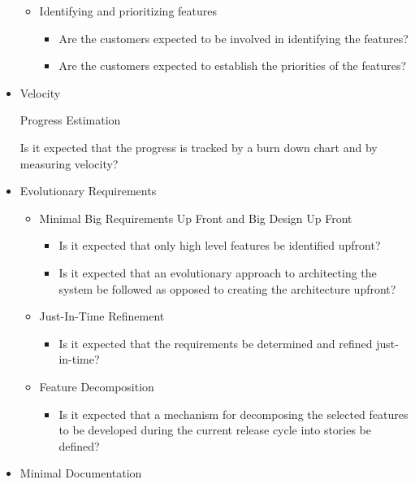 \begin{appendices}
\begin{itemize}
\begin{itemize}
			\item Identifying and prioritizing features
				\begin{itemize}
					\item Are the customers expected to be involved in identifying the features?
					\item Are the customers expected to establish the priorities of the features?
				\end{itemize}
		\end{itemize}
	\item Velocity
		\begin{itemize}
			\addition Progress Estimation
				\begin{itemize}
					\addition Is it expected that the progress is tracked by a burn down chart and by measuring velocity?
				\end{itemize}
		\end{itemize}
	\item Evolutionary Requirements
		\begin{itemize}
			\item Minimal Big Requirements Up Front and Big Design Up Front
				\begin{itemize}
					\item Is it expected that only high level features be identified upfront?
					\item Is it expected that an evolutionary approach to architecting the system be followed as opposed to creating the architecture upfront?
				\end{itemize}
			\item Just-In-Time Refinement
				\begin{itemize}
					\item Is it expected that the requirements be determined and refined just-in-time?
				\end{itemize}
			\item Feature Decomposition
				\begin{itemize}
					\item Is it expected that a mechanism for decomposing the selected features to be developed during the current release cycle into stories be defined?
				\end{itemize}
		\end{itemize}
	\item Minimal Documentation

\end{itemize}
\end{appendices}
